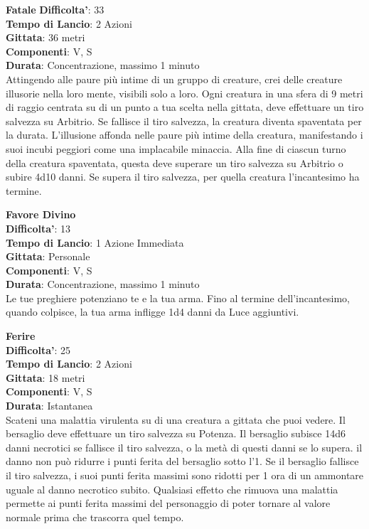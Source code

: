 \begin{multicols}{2}
\medskip\textbf{Fatale}
\textbf{Difficolta'}: 33\\
\textbf{Tempo di Lancio}: 2 Azioni\\
\textbf{Gittata}: 36 metri\\
\textbf{Componenti}: V, S\\
\textbf{Durata}: Concentrazione, massimo 1 minuto\\
Attingendo alle paure più intime di un gruppo di creature, crei delle creature illusorie nella loro mente, visibili solo a loro. Ogni creatura in una sfera di 9 metri di raggio centrata su di un punto a tua scelta nella gittata, deve effettuare un tiro salvezza su Arbitrio. Se fallisce il tiro salvezza, la creatura diventa spaventata per la durata. L’illusione affonda nelle paure più intime della creatura, manifestando i suoi incubi peggiori come una implacabile minaccia. Alla fine di ciascun turno della creatura spaventata, questa deve superare un tiro salvezza su Arbitrio o subire 4d10 danni. Se supera il tiro salvezza, per quella creatura l’incantesimo ha termine.

\medskip\textbf{Favore Divino}\\
\textbf{Difficolta'}: 13\\
\textbf{Tempo di Lancio}: 1 Azione Immediata\\
\textbf{Gittata}: Personale\\
\textbf{Componenti}: V, S\\
\textbf{Durata}: Concentrazione, massimo 1 minuto\\
Le tue preghiere potenziano te e la tua arma. Fino al termine dell’incantesimo, quando colpisce, la tua arma infligge 1d4 danni da Luce aggiuntivi.

\medskip\textbf{Ferire}\\
\textbf{Difficolta'}: 25\\
\textbf{Tempo di Lancio}: 2 Azioni\\
\textbf{Gittata}: 18 metri\\
\textbf{Componenti}: V, S\\
\textbf{Durata}: Istantanea\\
Scateni una malattia virulenta su di una creatura a gittata che puoi vedere. Il bersaglio deve effettuare un tiro salvezza su Potenza. Il bersaglio subisce 14d6 danni necrotici se fallisce il tiro salvezza, o la metà di questi danni se lo supera. il danno non può ridurre i punti ferita del bersaglio sotto l’1. Se il bersaglio fallisce il tiro salvezza, i suoi punti ferita massimi sono ridotti per 1 ora di un ammontare uguale al danno necrotico subito. Qualsiasi effetto che rimuova una malattia permette ai punti ferita massimi del personaggio di poter tornare al valore normale prima che trascorra quel tempo.


\end{multicols}
